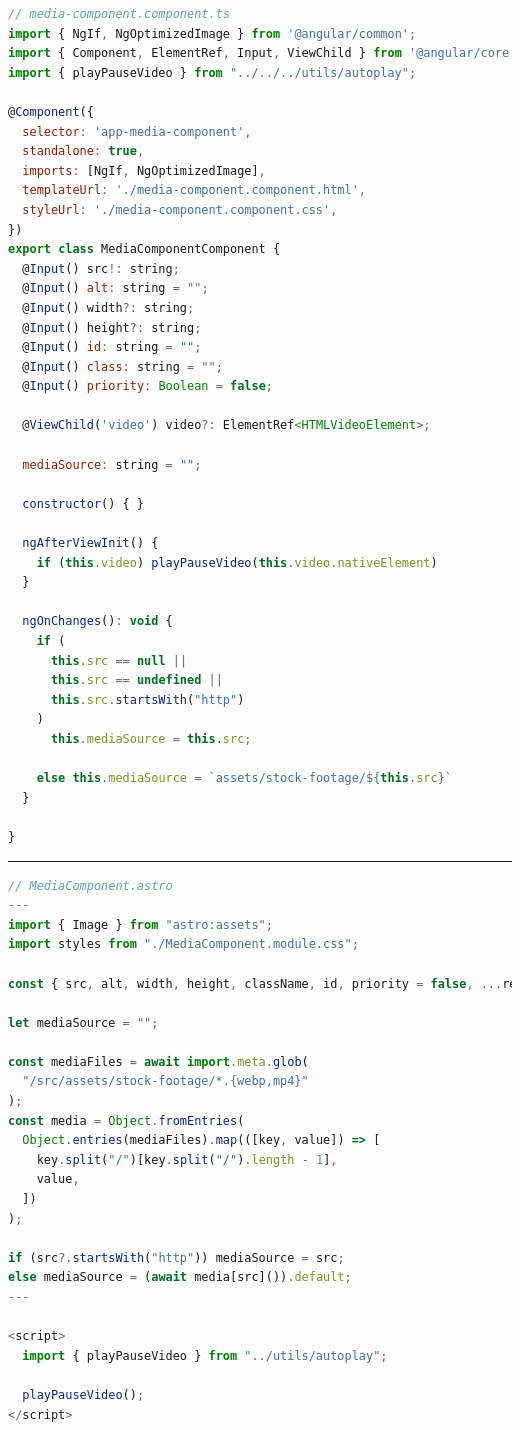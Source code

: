\documentclass[a4paper, 12pt]{article}
\begin{document}
\begin{lstlisting}[caption=MediaComponent in Angular (Module), label={lst:Angular:MediaComponent:Module}, language=JavaScript]
// media-component.component.ts
import { NgIf, NgOptimizedImage } from '@angular/common';
import { Component, ElementRef, Input, ViewChild } from '@angular/core';
import { playPauseVideo } from "../../../utils/autoplay";

@Component({
  selector: 'app-media-component',
  standalone: true,
  imports: [NgIf, NgOptimizedImage],
  templateUrl: './media-component.component.html',
  styleUrl: './media-component.component.css',
})
export class MediaComponentComponent {
  @Input() src!: string;
  @Input() alt: string = "";
  @Input() width?: string;
  @Input() height?: string;
  @Input() id: string = "";
  @Input() class: string = "";
  @Input() priority: Boolean = false;

  @ViewChild('video') video?: ElementRef<HTMLVideoElement>;

  mediaSource: string = "";

  constructor() { }

  ngAfterViewInit() {
    if (this.video) playPauseVideo(this.video.nativeElement)
  }

  ngOnChanges(): void {
    if (
      this.src == null ||
      this.src == undefined ||
      this.src.startsWith("http")
    )
      this.mediaSource = this.src;

    else this.mediaSource = `assets/stock-footage/${this.src}`
  }

}
\end{lstlisting}

\vspace{0.5cm} \hrule \vspace{0.5cm}

\begin{lstlisting}[caption=MediaComponent in pure Astro (Frontmatter \& Script), label={lst:Astro:MediaComponent:Script}, language=JavaScript]
// MediaComponent.astro
---
import { Image } from "astro:assets";
import styles from "./MediaComponent.module.css";

const { src, alt, width, height, className, id, priority = false, ...rest } = Astro.props;

let mediaSource = "";

const mediaFiles = await import.meta.glob(
  "/src/assets/stock-footage/*.{webp,mp4}"
);
const media = Object.fromEntries(
  Object.entries(mediaFiles).map(([key, value]) => [
    key.split("/")[key.split("/").length - 1],
    value,
  ])
);

if (src?.startsWith("http")) mediaSource = src;
else mediaSource = (await media[src]()).default;
---

<script>
  import { playPauseVideo } from "../utils/autoplay";

  playPauseVideo();
</script>
\end{lstlisting}
\end{document}
